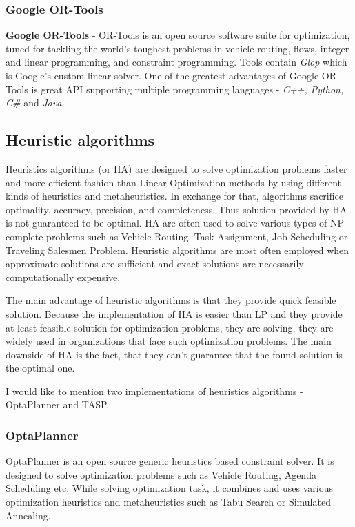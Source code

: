 \subsubsection{Google OR-Tools}
\textbf{Google OR-Tools} - OR-Tools is an open source software suite for optimization,
tuned for tackling the world's toughest problems in vehicle routing, flows,
integer and linear programming, and constraint programming\cite{web:googleOrTools}.
Tools contain \textit{Glop} which is Google's custom linear solver.
One of the greatest advantages of Google OR-Tools is great API supporting multiple programming languages - \textit{C++, Python, C\#} and \textit{Java}.


\subsection{Heuristic algorithms}\label{subsec:heuristic-algorithms}
Heuristics algorithms (or HA) are designed to solve optimization problems faster
and more efficient fashion than Linear Optimization methods by using different kinds of heuristics and metaheuristics.
In exchange for that, algorithms sacrifice optimality, accuracy, precision, and completeness.
Thus solution provided by HA is not guaranteed to be optimal.
HA are often used to solve various types of NP-complete problems such as
Vehicle Routing, Task Assignment, Job Scheduling or Traveling Salesmen Problem.
Heuristic algorithms are most often employed when approximate solutions are sufficient
and exact solutions are necessarily computationally expensive\cite{papanikolaou2018holistic}.

The main advantage of heuristic algorithms is that they provide quick feasible solution.
Because the implementation of HA is easier than LP and they provide at least feasible solution for optimization problems,
they are solving, they are widely used in organizations that face such optimization problems.
The main downside of HA is the fact, that they can't guarantee that the found solution is the optimal one.

\medskip
\noindent I would like to mention two implementations of heuristics algorithms - OptaPlanner and TASP\@.

\subsubsection{OptaPlanner}\label{subsubsec:heuristic-algs-optaplanner}
OptaPlanner is an open source generic heuristics based constraint solver.
It is designed to solve optimization problems such as Vehicle Routing, Agenda Scheduling etc.
While solving optimization task, it combines and uses various optimization heuristics and metaheuristics such as
Tabu Search or Simulated Annealing.

